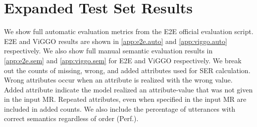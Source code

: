\section{Expanded Test Set Results}
\label{app:exp.results}


We show full automatic evaluation metrics from the E2E official
evaluation script. E2E and ViGGO results are shown in \autoref{app:e2e.auto}
and \autoref{app:viggo.auto} respectively.
We also show full manual semantic evaluation results in \autoref{app:e2e.sem}
and \autoref{app:viggo.sem} for E2E and ViGGO respectively.
We break out the counts of missing, wrong, and added attributes used for SER
calculation. Wrong attributes occur when an attribute is realized with 
the wrong value. Added attribute indicate the model realized an attribute-value
that was not given in the input MR. Repeated attributes, even when specified
in the input MR are included in added counts.
We also include the percentage of utterances with correct
semantics regardless of order (Perf.).








